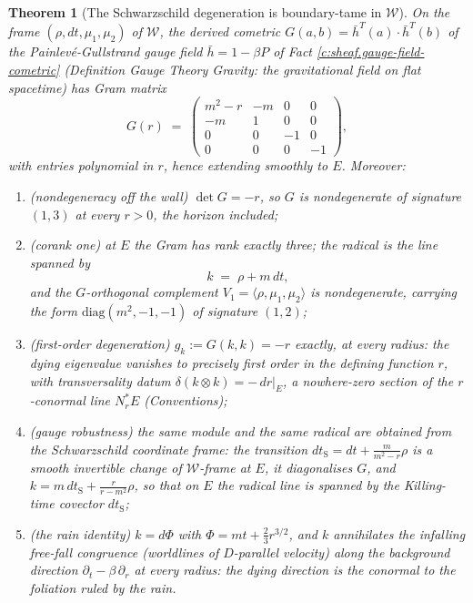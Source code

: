 \documentclass[11pt]{article}
\newtheorem{theorem}{Theorem}[section]
\theoremstyle{definition}
\theoremstyle{plain}
\newcommand{\changedmark}[2]{\marginpar{\raggedright\scriptsize\color{#1}#2}}
\providecommand{\dtPG}{}\renewcommand{\dtPG}{dt}
\providecommand{\dtS}{}\renewcommand{\dtS}{dt_{\mathrm{S}}}
\providecommand{\hb}{}\renewcommand{\hb}{\bar{h}}
\providecommand{\shW}{}\renewcommand{\shW}{\mathcal{W}}
\begin{document}
\begin{theorem}[The Schwarzschild degeneration is boundary-tame in $\shW$]\label{c:sheaf.schwarzschild-degeneration-boundary-tame}
\changedmark{gray}{reworded}
On the frame $(\rho, \dtPG, \mu_1, \mu_2)$ of $\shW$, the derived cometric $G(a,b) = \hb^{T}(a) \cdot \hb^{T}(b)$ of the Painlev\'e-Gullstrand gauge field $\hb = 1 - \beta P$ of Fact \ref{c:sheaf.gauge-field-cometric} (Definition \emph{Gauge Theory Gravity: the gravitational field on flat spacetime}) has Gram matrix
\[
G(r) \;=\;
\begin{pmatrix}
m^2 - r & -m & 0 & 0\\
-m & 1 & 0 & 0\\
0 & 0 & -1 & 0\\
0 & 0 & 0 & -1
\end{pmatrix},
\]
with entries polynomial in $r$, hence extending smoothly to $E$. Moreover:
\begin{enumerate}
\item (nondegeneracy off the wall) $\det G = -r$, so $G$ is nondegenerate of signature $(1,3)$ at every $r > 0$, the horizon included;
\item (corank one) at $E$ the Gram has rank exactly three; the radical is the line spanned by
\[
k \;=\; \rho + m\,\dtPG ,
\]
and the $G$-orthogonal complement $V_1 = \langle \rho, \mu_1, \mu_2\rangle$ is nondegenerate, carrying the form $\mathrm{diag}(m^2, -1, -1)$ of signature $(1,2)$;
\item (first-order degeneration) $g_k := G(k,k) = -r$ \emph{exactly}, at every radius: the dying eigenvalue vanishes to precisely first order in the defining function $r$, with transversality datum $\delta(k \otimes k) = -\,dr|_E$, a nowhere-zero section of the $r$-conormal line $N^*_rE$ (Conventions);
\item (gauge robustness) the same module and the same radical are obtained from the Schwarzschild coordinate frame: the transition $\dtS = \dtPG + \tfrac{m}{m^2 - r}\rho$ is a smooth invertible change of $\shW$-frame at $E$, it diagonalises $G$, and $k = m\,\dtS + \tfrac{r}{r - m^2}\rho$, so that on $E$ the radical line is spanned by the Killing-time covector $\dtS$;
\item (the rain identity) $k = d\Phi$ with $\Phi = m t + \tfrac23 r^{3/2}$, and $k$ annihilates the infalling free-fall congruence (worldlines of $D$-parallel velocity) along the background direction $\partial_t - \beta\,\partial_r$ at \emph{every} radius: the dying direction is the conormal to the foliation ruled by the rain.
\end{enumerate}
\end{theorem}
\end{document}
